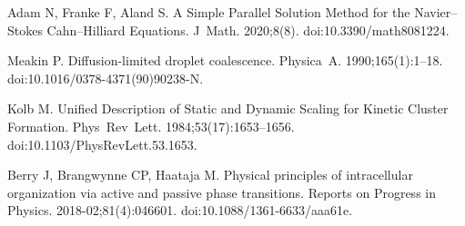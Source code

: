 \documentclass[10pt,letterpaper]{article}
\begin{document}
\begin{thebibliography}{10}
Adam N, Franke F, Aland S.
\newblock A Simple Parallel Solution Method for the Navier–Stokes
  Cahn–Hilliard Equations.
\newblock J~Math. 2020;8(8).
\newblock doi:{10.3390/math8081224}.

Meakin P.
\newblock Diffusion-limited droplet coalescence.
\newblock Physica~A. 1990;165(1):1--18.
\newblock doi:{10.1016/0378-4371(90)90238-N}.

Kolb M.
\newblock Unified Description of Static and Dynamic Scaling for Kinetic Cluster
  Formation.
\newblock Phys~Rev~Lett. 1984;53(17):1653--1656.
\newblock doi:{10.1103/PhysRevLett.53.1653}.

Berry J, Brangwynne CP, Haataja M.
\newblock Physical principles of intracellular organization via active and
  passive phase transitions.
\newblock Reports on Progress in Physics. 2018-02;81(4):046601.
\newblock doi:{10.1088/1361-6633/aaa61e}.

\end{thebibliography}
\end{document}
